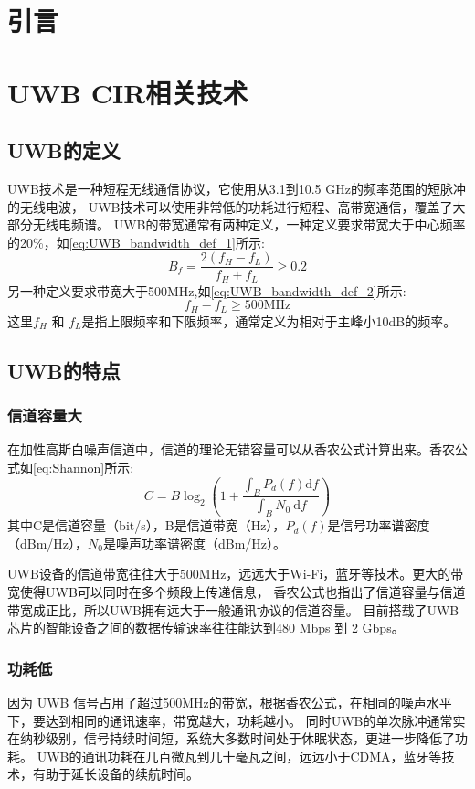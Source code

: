 \section{引言}
\section{UWB CIR相关技术}
\subsection{UWB的定义}
UWB技术是一种短程无线通信协议，它使用从3.1到10.5 GHz的频率范围的短脉冲的无线电波，
UWB技术可以使用非常低的功耗进行短程、高带宽通信，覆盖了大部分无线电频谱。
UWB的带宽通常有两种定义，一种定义要求带宽大于中心频率的20\%，如\ref{eq:UWB_bandwidth_def_1}所示:
\begin{equation}\label{eq:UWB_bandwidth_def_1}
    B_f=\frac{2\left(f_H-f_L\right)}{f_H+f_L} \geq 0.2
\end{equation}
另一种定义要求带宽大于500MHz,如\ref{eq:UWB_bandwidth_def_2}所示:
\begin{equation}\label{eq:UWB_bandwidth_def_2}
    f_H-f_L \geq 500 \mathrm{MHz}
\end{equation}
这里\(f_H\) 和 \(f_L\)是指上限频率和下限频率，通常定义为相对于主峰小10dB的频率\cite{UWB_Characteristics}。

\subsection{UWB的特点}

\subsubsection{信道容量大}
在加性高斯白噪声信道中，信道的理论无错容量可以从香农公式\cite{Shannon}计算出来。香农公式如\ref{eq:Shannon}所示:
\begin{equation}\label{eq:Shannon}
C=B \log _2\left(1+\frac{\int_B P_d(f) \mathrm{d} f}{\int_B N_0 \mathrm{~d} f}\right)
\end{equation}
其中C是信道容量（bit/s），B是信道带宽（Hz），\(P_d(f)\)是信号功率谱密度（dBm/Hz），\(N_0\)是噪声功率谱密度（dBm/Hz）。

UWB设备的信道带宽往往大于500MHz，远远大于Wi-Fi，蓝牙等技术。更大的带宽使得UWB可以同时在多个频段上传递信息，
香农公式也指出了信道容量与信道带宽成正比，所以UWB拥有远大于一般通讯协议的信道容量。
目前搭载了UWB芯片的智能设备之间的数据传输速率往往能达到480 Mbps 到 2 Gbps。

\subsubsection{功耗低}
因为 UWB 信号占用了超过500MHz的带宽，根据香农公式，在相同的噪声水平下，要达到相同的通讯速率，带宽越大，功耗越小。
同时UWB的单次脉冲通常实在纳秒级别，信号持续时间短，系统大多数时间处于休眠状态，更进一步降低了功耗。
UWB的通讯功耗在几百微瓦到几十毫瓦之间，远远小于CDMA，蓝牙等技术，有助于延长设备的续航时间\cite{CDMA}。

